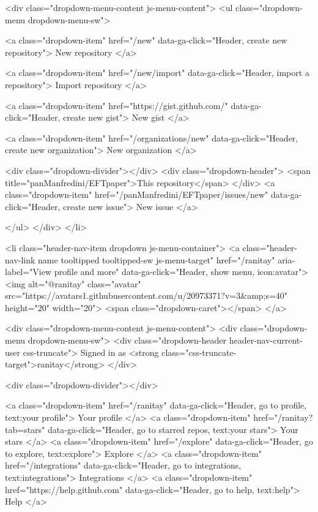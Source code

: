     <div class="dropdown-menu-content js-menu-content">
      <ul class="dropdown-menu dropdown-menu-sw">
        
<a class="dropdown-item" href="/new" data-ga-click="Header, create new repository">
  New repository
</a>

  <a class="dropdown-item" href="/new/import" data-ga-click="Header, import a repository">
    Import repository
  </a>

<a class="dropdown-item" href="https://gist.github.com/" data-ga-click="Header, create new gist">
  New gist
</a>

  <a class="dropdown-item" href="/organizations/new" data-ga-click="Header, create new organization">
    New organization
  </a>



  <div class="dropdown-divider"></div>
  <div class="dropdown-header">
    <span title="panManfredini/EFTpaper">This repository</span>
  </div>
    <a class="dropdown-item" href="/panManfredini/EFTpaper/issues/new" data-ga-click="Header, create new issue">
      New issue
    </a>

      </ul>
    </div>
  </li>

  <li class="header-nav-item dropdown js-menu-container">
    <a class="header-nav-link name tooltipped tooltipped-sw js-menu-target" href="/ranitay"
       aria-label="View profile and more"
       data-ga-click="Header, show menu, icon:avatar">
      <img alt="@ranitay" class="avatar" src="https://avatars1.githubusercontent.com/u/20973371?v=3&amp;s=40" height="20" width="20">
      <span class="dropdown-caret"></span>
    </a>

    <div class="dropdown-menu-content js-menu-content">
      <div class="dropdown-menu dropdown-menu-sw">
        <div class="dropdown-header header-nav-current-user css-truncate">
          Signed in as <strong class="css-truncate-target">ranitay</strong>
        </div>

        <div class="dropdown-divider"></div>

        <a class="dropdown-item" href="/ranitay" data-ga-click="Header, go to profile, text:your profile">
          Your profile
        </a>
        <a class="dropdown-item" href="/ranitay?tab=stars" data-ga-click="Header, go to starred repos, text:your stars">
          Your stars
        </a>
        <a class="dropdown-item" href="/explore" data-ga-click="Header, go to explore, text:explore">
          Explore
        </a>
          <a class="dropdown-item" href="/integrations" data-ga-click="Header, go to integrations, text:integrations">
            Integrations
          </a>
        <a class="dropdown-item" href="https://help.github.com" data-ga-click="Header, go to help, text:help">
          Help
        </a>

